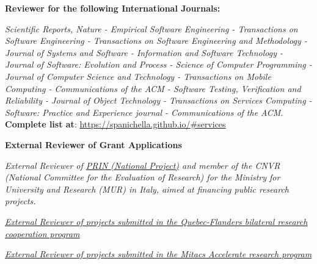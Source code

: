 \documentclass[11pt]{article}
\begin{document}


\textbf{Reviewer for the following International Journals:}
\begin{innerlist}
\item \emph{Scientific Reports, Nature - Empirical Software Engineering - Transactions on Software Engineering - Transactions on Software Engineering and Methodology - Journal of Systems and Software - Information and Software Technology - Journal of Software: Evolution and Process - Science of Computer Programming - Journal of Computer Science and Technology - Transactions on Mobile Computing - Communications of the ACM - Software Testing, Verification and Reliability - Journal of Object Technology - Transactions on Services Computing - Software: Practice and Experience journal
- Communications of the ACM}. \\ \textbf{Complete list at}: \href{https://spanichella.github.io/\#services}{https://spanichella.github.io/\#services}
\end{innerlist} 

\medskip 
\textbf{External Reviewer of Grant Applications}
\begin{innerlist}

   \item \emph{External Reviewer of \href{https://prin.mur.gov.it/}
                   {PRIN (National Project)} and member of the CNVR (National Committee for the Evaluation of Research) for the Ministry for University and Research (MUR) in Italy, aimed at financing public research projects. }

   \item \emph{
              \href{http://www.frqnt.gouv.qc.ca/accueil}
                   {External Reviewer of projects submitted in the Quebec-Flanders bilateral research cooperation program}}
\item \emph{
              \href{}
                   {External Reviewer of projects submitted in the Mitacs Accelerate research program\\\\}}
                   
\end{innerlist}
\end{document}
